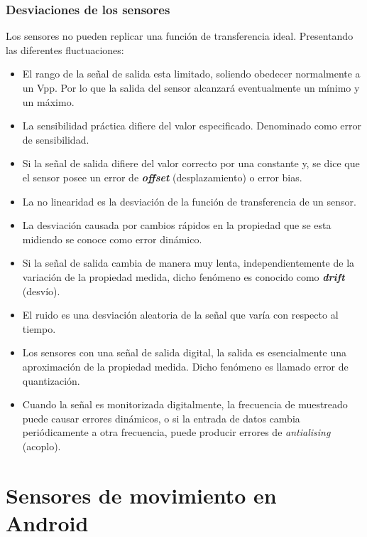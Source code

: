 \subsubsection{Desviaciones de los sensores}

Los sensores no pueden replicar una función de transferencia ideal. Presentando las diferentes fluctuaciones:

\begin{itemize}
\item El rango de la señal de salida esta limitado, soliendo obedecer normalmente a un Vpp. Por lo que la salida del sensor alcanzará eventualmente un mínimo y un máximo.

\item La sensibilidad práctica difiere del valor especificado. Denominado como error de sensibilidad.

\item Si la señal de salida difiere del valor correcto por una constante y, se dice que el sensor posee un error de \textit{\textbf{offset}} (desplazamiento) o error bias.

\item La no linearidad es la desviación de la función de transferencia de un sensor.

\item La desviación causada por cambios rápidos en la propiedad que se esta midiendo se conoce como error dinámico.

\item Si la señal de salida cambia de manera muy lenta, independientemente de la variación de la propiedad medida, dicho fenómeno es conocido como \textit{\textbf{drift}} (desvío).

\item El ruido es una desviación aleatoria de la señal que varía con respecto al tiempo.

\item Los sensores con una señal de salida digital, la salida es esencialmente una aproximación de la propiedad medida. Dicho fenómeno es llamado error de quantización.

\item Cuando la señal es monitorizada digitalmente, la frecuencia de muestreado puede causar errores dinámicos, o si la entrada de datos cambia periódicamente a otra frecuencia, puede producir errores de \textit{antialising} (acoplo).

\end{itemize}

\section{Sensores de movimiento en Android}

